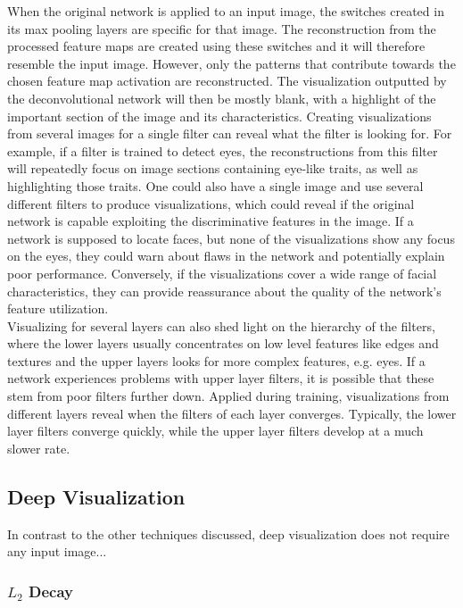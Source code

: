\noindent When the original network is applied to an input image, the switches created in its max pooling layers are specific for that image. The reconstruction from the processed feature maps are created using these switches and it will therefore resemble the input image. However, only the patterns that contribute towards the chosen feature map activation are reconstructed. The visualization outputted by the deconvolutional network will then be mostly blank, with a highlight of the important section of the image and its characteristics. Creating visualizations from several images for a single filter can reveal what the filter is looking for. For example, if a filter is trained to detect eyes, the reconstructions from this filter will repeatedly focus on image sections containing eye-like traits, as well as highlighting those traits. One could also have a single image and use several different filters to produce visualizations, which could reveal if the original network is capable exploiting the discriminative features in the image. If a network is supposed to locate faces, but none of the visualizations show any focus on the eyes, they could warn about flaws in the network and potentially explain poor performance. Conversely, if the visualizations cover a wide range of facial characteristics, they can provide reassurance about the quality of the network's feature utilization. \\

\noindent Visualizing for several layers can also shed light on the hierarchy of the filters, where the lower layers usually concentrates on low level features like edges and textures and the upper layers looks for more complex features, e.g. eyes. If a network experiences problems with upper layer filters, it is possible that these stem from poor filters further down. Applied during training, visualizations from different layers reveal when the filters of each layer converges. Typically, the lower layer filters converge quickly, while the upper layer filters develop at a much slower rate.


\subsection{Deep Visualization}

In contrast to the other techniques discussed, deep visualization does not require any input image...

\subsubsection{$L_2$ Decay}

